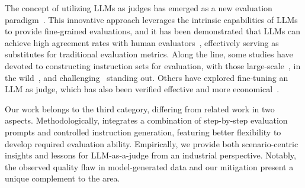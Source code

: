 The concept of utilizing LLMs as judges has emerged as a new evaluation paradigm~\cite{zheng2023judging,lin2024RethinkingAlignment}. This innovative approach leverages the intrinsic capabilities of LLMs to provide fine-grained evaluations, and it has been demonstrated that LLMs can achieve high agreement rates with human evaluators~\cite{zheng2023judging,lin2024wildbench}, effectively serving as substitutes for traditional evaluation metrics. Along the line, some studies have devoted to constructing instruction sets for evaluation, with those large-scale~\cite{zheng2024lmsyschat1m}, in the wild~\cite{lin2024wildbench}, and challenging~\cite{li2024crowdsourceddatahighqualitybenchmarks} standing out.
Others have explored fine-tuning an LLM as judge, which has also been verified effective and more economical~\cite{ke2024critiquellm,li2023autoj,vu2024foundationalautoraterstaminglarge}. 

Our work belongs to the third category, differing from related work in two aspects. Methodologically, \modelname integrates a combination of step-by-step evaluation prompts and controlled instruction generation, featuring better flexibility to develop required evaluation ability. Empirically, we provide both scenario-centric insights and lessons for LLM-as-a-judge from an industrial perspective. Notably, the observed quality flaw in model-generated  data and our mitigation present a unique complement to the area.
















